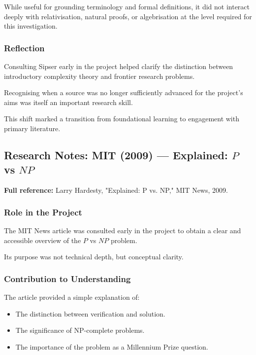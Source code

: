 \documentclass[12pt]{article}
\begin{document}
While useful for grounding terminology and formal definitions, it did not interact deeply with relativisation, natural proofs, or algebrisation at the level required for this investigation.

\subsubsection*{Reflection}

Consulting Sipser early in the project helped clarify the distinction between introductory complexity theory and frontier research problems.

Recognising when a source was no longer sufficiently advanced for the project's aims was itself an important research skill.

This shift marked a transition from foundational learning to engagement with primary literature.

\subsection{Research Notes: MIT (2009) --- Explained: $P$ vs $NP$}

\textbf{Full reference:} Larry Hardesty,
"Explained: P vs. NP,"
MIT News, 2009.

\subsubsection*{Role in the Project}

The MIT News article was consulted early in the project to obtain a clear and accessible overview of the $P$ vs $NP$ problem.

Its purpose was not technical depth, but conceptual clarity.

\subsubsection*{Contribution to Understanding}

The article provided a simple explanation of:

\begin{itemize}
\item The distinction between verification and solution.
\item The significance of NP-complete problems.
\item The importance of the problem as a Millennium Prize question.
\end{itemize}
\end{document}
